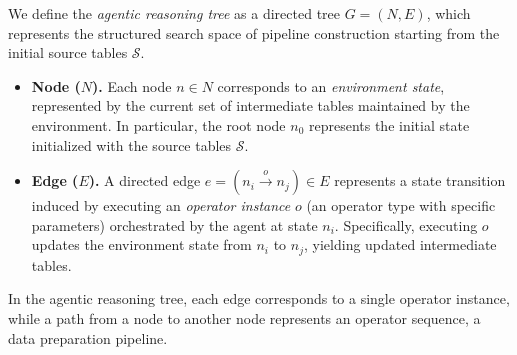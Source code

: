 We define the \emph{agentic reasoning tree} as a directed tree $G=(N,E)$, which represents the structured search space of pipeline construction starting from the initial source tables $\mathcal{S}$.
%
\begin{itemize}[leftmargin=1em]
    \item \textbf{Node ($N$).}
    Each node $n \in N$ corresponds to an \emph{environment state}, represented by the current set of intermediate tables maintained by the environment. In particular, the root node $n_0$ represents the initial state initialized with the source tables $\mathcal{S}$.
%
    \item \textbf{Edge ($E$).}  
    A directed edge $e=(n_i \xrightarrow{o} n_j) \in E$ represents a state transition induced by executing an \emph{operator instance} $o$ (\ie an operator type with specific parameters) orchestrated by the agent at state $n_i$. Specifically, executing $o$ updates the environment state from $n_i$ to $n_j$, yielding updated intermediate tables. 
\end{itemize}
%
In the agentic reasoning tree, each edge corresponds to a single operator instance, while a path from a node to another node represents an operator sequence, \ie a data preparation pipeline. 


%
%

